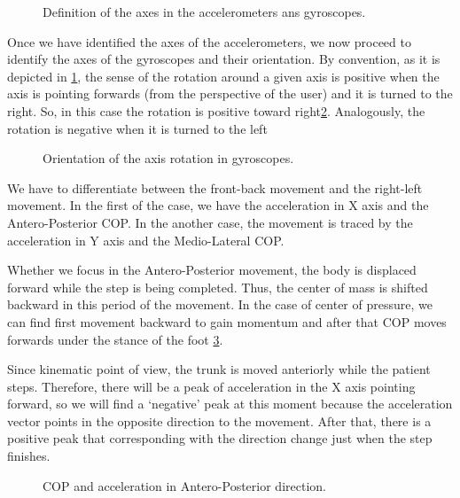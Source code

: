 \begin{figure}[H]
	\centering
	\caption{Definition of the axes in the accelerometers ans gyroscopes.}
	\label{fig:axesGW}
\end{figure}

Once we have identified the axes of the accelerometers, we now proceed to identify the axes of the gyroscopes and their orientation. By convention, as it is depicted in \ref{fig:axesGW}, the sense of the rotation around a given axis is positive when the axis is pointing forwards (from the perspective of the user) and it is turned to the right. So, in this case the rotation is positive toward right\ref{fig:axesGWGyro}. Analogously, the rotation is negative when it is turned to the left  \cite{OlivaresBotzel2013}

\begin{figure}[H]
	\centering
	\caption{Orientation of the axis rotation in gyroscopes.}
	\label{fig:axesGWGyro}
\end{figure}


We have to differentiate between the front-back movement and the right-left movement. In the first of the case, we have the acceleration in X axis and the Antero-Posterior COP. In the another case, the movement is traced by the acceleration in Y axis and the Medio-Lateral  COP.

Whether we focus in the Antero-Posterior movement, the body is displaced forward while the step is being completed. Thus, the center of mass is shifted backward in this period of the movement. In the case of center of pressure, we can find first  movement backward to gain momentum and after that  COP moves forwards under the stance of the foot \ref{fig:AP_AccX}.

Since kinematic point of view, the trunk is moved anteriorly while the patient steps. Therefore, there will be a peak of acceleration in the X axis pointing forward, so we will find a ‘negative’ peak at this moment because the acceleration vector points in the opposite direction to the movement. After that, there is a positive peak that corresponding with the direction change just when the step finishes. 

\begin{figure}[H]
	\centering
	\caption{COP and acceleration in Antero-Posterior direction.}
	\label{fig:AP_AccX}
\end{figure}


